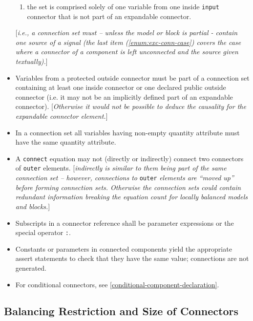 \begin{itemize}
\begin{enumerate}
\item the  set is comprised solely of one variable from one inside \lstinline!input!
  connector that is not part of an expandable connector. \label{enum:exc-conn-case}
\end{enumerate}
{[}\emph{i.e., a connection set must -- unless the model or block is partial -
  contain one source of a signal (the last item (\autoref{enum:exc-conn-case}) covers the case
  where a connector of a component is left unconnected and the source
  given textually).}{]}
\item
  Variables from a protected outside connector must be part of a
  connection set containing at least one inside connector or one
  declared public outside connector (i.e. it may not be an implicitly
  defined part of an expandable connector). {[}\emph{Otherwise it would
  not be possible to deduce the causality for the expandable connector
  element.}{]}
\item
  In a connection set all variables having non-empty quantity attribute
  must have the same quantity attribute.
\item
  A \lstinline!connect! equation may not (directly or indirectly) connect two
  connectors of \lstinline!outer! elements. {[}\emph{indirectly is similar to them
  being part of the same connection set -- however, connections to}
  \lstinline!outer! \emph{elements are ``moved up'' before forming connection sets.
  Otherwise the connection sets could contain redundant information
  breaking the equation count for locally balanced models and
  blocks.}{]}
\item
  Subscripts in a connector reference shall be parameter expressions or
  the special operator \lstinline!:!.
\item
  Constants or parameters in connected components yield the appropriate
  assert statements to check that they have the same value; connections
  are not generated.
\item
  For conditional connectors, see \autoref{conditional-component-declaration}.
\end{itemize}

\subsection{Balancing Restriction and Size of Connectors}

